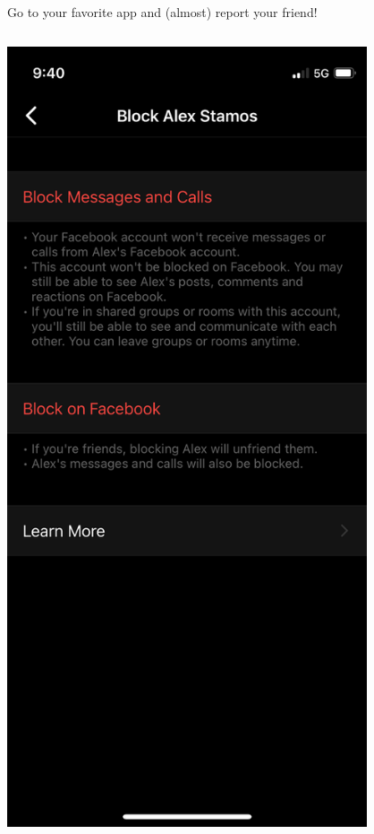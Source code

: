 \documentclass[nobackground,dvipsnames,table,aspectratio=169]{beamer}
\begin{document}
\begin{frame}{Go to your favorite app and (almost) report your friend!}
\begin{columns}
            \includegraphics[width=0.85\textwidth]{block-alex-stamos-2}
    \end{columns}
\end{frame}
\end{document}
